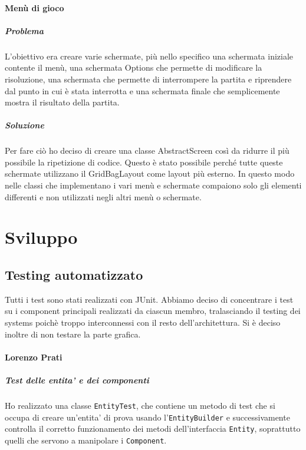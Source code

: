 \documentclass[a4paper,12pt]{report}
\begin{document}
\subsubsection*{Menù di gioco}
\paragraph*{Problema}
	L'obiettivo era creare varie schermate, più nello specifico una schermata iniziale contente il menù, una schermata Options che permette di modificare la risoluzione, una schermata che permette di interrompere la partita e riprendere dal punto in cui è stata interrotta e una schermata finale che semplicemente mostra il risultato della partita.
\paragraph*{Soluzione}
	Per fare ciò ho deciso di creare una classe AbstractScreen così da ridurre il più possibile la ripetizione di codice. Questo è stato possibile perché tutte queste schermate utilizzano il GridBagLayout come layout più esterno.
	In questo modo nelle classi che implementano i vari menù e schermate compaiono solo gli elementi differenti e non utilizzati negli altri menù o schermate.


\chapter{Sviluppo}

\section{Testing automatizzato}

Tutti i test sono stati realizzati con JUnit. Abbiamo deciso di concentrare i test su i component principali realizzati da ciascun membro, tralasciando il testing dei systems poichè troppo interconnessi con il resto dell'architettura.
Si è deciso inoltre di non testare la parte grafica.

\subsubsection*{Lorenzo Prati}

\paragraph*{Test delle entita' e dei componenti}
Ho realizzato una classe \texttt{EntityTest}, che contiene un metodo di test che si occupa di creare un'entita' di prova usando l'\texttt{EntityBuilder} e successivamente controlla il corretto funzionamento dei metodi dell'interfaccia \texttt{Entity}, soprattutto quelli che servono a manipolare i \texttt{Component}.
\end{document}
